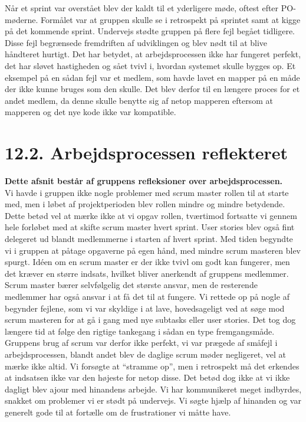 \documentclass[11pt]{report}
\begin{document}
Når et sprint var overstået blev der kaldt til et yderligere møde, oftest efter PO-møderne. Formålet var at gruppen skulle se i retrospekt på sprintet samt at kigge på det kommende sprint. 
Undervejs stødte gruppen på flere fejl begået tidligere. Disse fejl begrænsede fremdriften af udviklingen og blev nødt til at blive håndteret hurtigt. Det har betydet, at arbejdsprocessen ikke har fungeret perfekt, det har sløvet hastigheden og sået tvivl i, hvordan systemet skulle bygges op. Et eksempel på en sådan fejl var et medlem, som havde lavet en mapper på en måde der ikke kunne bruges som den skulle. Det blev derfor til en længere proces for et andet medlem, da denne skulle benytte sig af netop mapperen eftersom at mapperen og det nye kode ikke var kompatible.
\newpage

\section*{12.2. Arbejdsprocessen reflekteret}
\textbf{Dette afsnit består af gruppens refleksioner over
  arbejdsprocessen.}\\
Vi havde i gruppen ikke nogle problemer med scrum master rollen til at starte med, men i løbet af projektperioden blev rollen mindre og mindre betydende. Dette betød vel at mærke ikke at vi opgav rollen, tværtimod fortsatte vi gennem hele forløbet med at skifte scrum master hvert sprint. User stories blev også fint delegeret ud blandt medlemmerne i starten af hvert sprint. Med tiden begyndte vi i gruppen at påtage opgaverne på egen hånd, med mindre scrum masteren blev spurgt. 
Idéen om en scrum master er der ikke tvivl om godt kan fungerer, men det kræver en større indsats, hvilket bliver anerkendt af gruppens medlemmer. Scrum master bærer selvfølgelig det største ansvar, men de resterende medlemmer har også ansvar i at få det til at fungere. Vi rettede op på nogle af begynder fejlene, som vi var skyldige i at lave, hovedsageligt ved at søge mod scrum masteren for at gå i gang med nye subtasks eller user stories. Det tog dog længere tid at følge den rigtige tankegang i sådan en type fremgangsmåde.
Gruppens brug af scrum var derfor ikke perfekt, vi var prægede af småfejl i arbejdsprocessen, blandt andet blev de daglige scrum møder negligeret, vel at mærke ikke altid. Vi forsøgte at “stramme op”, men i retrospekt må det erkendes at indsatsen ikke var den højeste for netop disse. Det betød dog ikke at vi ikke dagligt blev ajour med hinandens arbejde. Vi har kommunikeret meget indbyrdes, snakket om problemer vi er stødt på undervejs. Vi søgte hjælp af hinanden og var generelt gode til at fortælle om de frustrationer vi måtte have.
\end{document}
